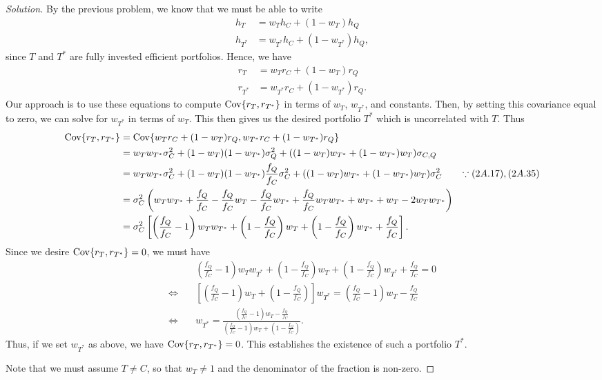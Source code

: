 \begin{proof}[Solution]
By the previous problem, we know that we must be able to write
\begin{align*}
h_{T} &= w_{T}h_{C} + (1 - w_{T})h_{Q}\\
h_{T^{\ast}} &= w_{T^{\ast}}h_{C} + (1 - w_{T^{\ast}})h_{Q},
\end{align*}
since $T$ and $T^{\ast}$ are fully invested efficient portfolios. Hence, we have
\begin{align*}
r_{T} &= w_{T}r_{C} + (1 - w_{T})r_{Q}\\
r_{T^{\ast}} &= w_{T^{\ast}}r_{C} + (1 - w_{T^{\ast}})r_{Q}.
\end{align*}
Our approach is to use these equations to compute $\mathrm{Cov}\{r_{T}, r_{T^{\ast}}\}$ in terms of $w_{T}$, $w_{T^{\ast}}$, and constants. Then, by setting this covariance equal to zero, we can solve for $w_{T^{\ast}}$ in terms of $w_{T}$. This then gives us the desired portfolio $T^{\ast}$ which is uncorrelated with $T$. Thus
\begin{align*}
\mathrm{Cov}\{r_{T}, r_{T^{\ast}}\} &= \mathrm{Cov}\{w_{T}r_{C} + (1 - w_{T})r_{Q}, w_{T^{\ast}}r_{C} + (1 - w_{T^{\ast}})r_{Q}\} \\
&= w_{T}w_{T^{\ast}}\sigma_{C}^{2} + (1 - w_{T})(1 - w_{T^{\ast}})\sigma_{Q}^{2} + ((1 - w_{T})w_{T^{\ast}} + (1 - w_{T^{\ast}})w_{T})\sigma_{C, Q}\\
&= w_{T}w_{T^{\ast}}\sigma_{C}^{2} + (1 - w_{T})(1 - w_{T^{\ast}})\frac{f_{Q}}{f_{C}}\sigma_{C}^{2} + ((1 - w_{T})w_{T^{\ast}} + (1 - w_{T^{\ast}})w_{T})\sigma_{C}^{2} & \because (2A.17), (2A.35)\\
&= \sigma_{C}^{2}\left(w_{T}w_{T^{\ast}} + \frac{f_{Q}}{f_{C}} - \frac{f_{Q}}{f_{C}}w_{T} - \frac{f_{Q}}{f_{C}}w_{T^{\ast}} + \frac{f_{Q}}{f_{C}}w_{T}w_{T^{\ast}} + w_{T^{\ast}} + w_{T} - 2w_{T}w_{T^{\ast}}\right) \\
&= \sigma_{C}^{2}\left[ \left(\frac{f_{Q}}{f_{C}} - 1 \right)w_{T}w_{T^{\ast}} + \left(1 - \frac{f_{Q}}{f_{C}}\right)w_{T} + \left(1 - \frac{f_{Q}}{f_{C}}\right)w_{T^{\ast}} + \frac{f_{Q}}{f_{C}}\right].
\end{align*}
Since we desire $\mathrm{Cov}\{r_{T}, r_{T^{\ast}}\} = 0$, we must have
\begin{align*}
&\left(\frac{f_{Q}}{f_{C}} - 1 \right)w_{T}w_{T^{\ast}} + \left(1 - \frac{f_{Q}}{f_{C}}\right)w_{T} + \left(1 - \frac{f_{Q}}{f_{C}}\right)w_{T^{\ast}} + \frac{f_{Q}}{f_{C}} = 0\\
\iff \quad &\left[ \left(\frac{f_{Q}}{f_{C}} - 1\right) w_{T} + \left(1 - \frac{f_{Q}}{f_{C}}\right)\right]w_{T^{\ast}} = \left(\frac{f_{Q}}{f_{C}} - 1\right)w_{T} - \frac{f_{Q}}{f_{C}}\\
\iff \quad &w_{T^{\ast}} = \frac{\left(\frac{f_{Q}}{f_{C}} - 1\right)w_{T} -\frac{f_{Q}}{f_{C}}}{\left(\frac{f_{Q}}{f_{C}} - 1 \right)w_{T} + \left(1 - \frac{f_{Q}}{f_{C}}\right)}.
\end{align*}
Thus, if we set $w_{T^{\ast}}$ as above, we have $\mathrm{Cov}\{r_{T}, r_{T^{\ast}}\} = 0$. This establishes the existence of such a portfolio $T^{\ast}$.

Note that we must assume $T \neq C$, so that $w_{T} \neq 1$ and the denominator of the fraction is non-zero.
\end{proof}


